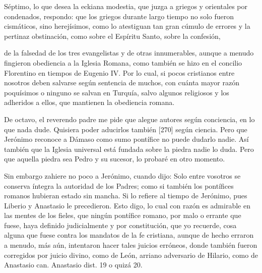 Séptimo, lo que desea la eckiana modestia, que juzga a griegos y orientales por condenados, respondo: que los griegos durante largo tiempo no solo fueron cismáticos, sino herejísimos, como lo atestiguan tan gran cúmulo de errores y la pertinaz obstinación, como sobre el Espíritu Santo, sobre la confesión,

de la falsedad de los tres evangelistas y de otras innumerables, aunque a menudo fingieron obediencia a la Iglesia Romana, como también se hizo en el concilio Florentino en tiempos de Eugenio IV. Por lo cual, si pocos cristianos entre nosotros deben salvarse según sentencia de muchos, con cuánta mayor razón poquísimos o ninguno se salvan en Turquía, salvo algunos religiosos y los adheridos a ellos, que mantienen la obediencia romana.

De octavo, el reverendo padre me pide que alegue autores según conciencia, en lo que nada dude. Quisiera poder aducirlos también [270] según ciencia. Pero que Jerónimo reconoce a Dámaso como sumo pontífice no puede dudarlo nadie. Así también que la Iglesia universal está fundada sobre la piedra nadie lo duda. Pero que aquella piedra sea Pedro y su sucesor, lo probaré en otro momento.

Sin embargo zahiere no poco a Jerónimo, cuando dijo: Solo entre vosotros se conserva íntegra la autoridad de los Padres; como si también los pontífices romanos hubieran estado sin mancha. Si lo refiere al tiempo de Jerónimo, pues Liberio y Anastasio le precedieron. Esto digo, lo cual con razón es admirable en las mentes de los fieles, que ningún pontífice romano, por malo o errante que fuese, haya definido judicialmente y por constitución, que yo recuerde, cosa alguna que fuese contra los mandatos de la fe cristiana, aunque de hecho erraron a menudo, más aún, intentaron hacer tales juicios erróneos, donde también fueron corregidos por juicio divino, como de León, arriano adversario de Hilario, como de Anastasio can. Anastasio dist. 19 o quizá 20.

